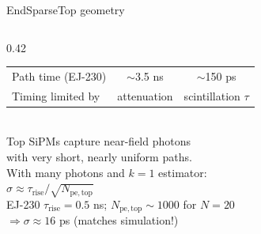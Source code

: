 \documentclass[aspectratio=169,9pt]{beamer}
\begin{document}
\begin{frame}{EndSparseTop geometry}
\begin{columns}[T]
\begin{column}{0.42\textwidth}
\begin{tabular}{lcc}
Path time (EJ-230) & $\sim$3.5 ns & $\sim$150 ps\\
Timing limited by & attenuation & scintillation $\tau$\\
\bottomrule
\end{tabular}\\[0.5em]
\normalsize
Top SiPMs capture near-field photons\\
with very short, nearly uniform paths.\\[0.3em]
With many photons and $k{=}1$ estimator:\\[0.2em]
$\sigma \approx \tau_\mathrm{rise}/\sqrt{N_\mathrm{pe,top}}$\\[0.2em]
\footnotesize
EJ-230 $\tau_\mathrm{rise}{=}0.5$ ns; $N_\mathrm{pe,top}{\sim}1000$ for $N{=}20$\\
$\Rightarrow \sigma \approx 16$ ps (matches simulation!)
\end{column}
\end{columns}
\end{frame}
\end{document}
